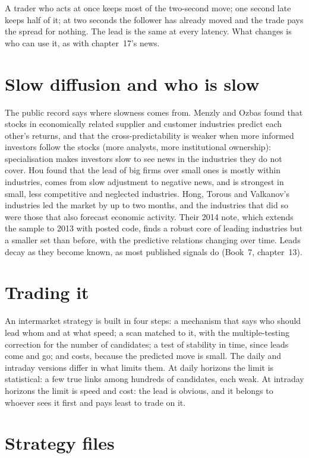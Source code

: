 A trader who acts at once keeps most of the two-second move; one second late keeps half of it; at two seconds the follower has already moved and the
trade pays the spread for nothing. The lead is the same at every latency. What changes is who can use it, as with chapter~17's news.

\section{Slow diffusion and who is slow}

The public record says where slowness comes from. Menzly and Ozbas found that stocks in economically related supplier and customer industries predict
each other's returns, and that the cross-predictability is weaker when more informed investors follow the stocks (more analysts, more institutional
ownership): specialisation makes investors slow to see news in the industries they do not cover. Hou found that the lead of big firms over small ones is
mostly within industries, comes from slow adjustment to negative news, and is strongest in small, less competitive and neglected industries. Hong,
Torous and Valkanov's industries led the market by up to two months, and the industries that did so were those that also forecast economic
activity. Their 2014 note, which extends the sample to 2013 with posted code, finds a robust core of leading industries but a smaller set than before,
with the predictive relations changing over time. Leads decay as they become known, as most published signals do (Book~7, chapter~13).

\section{Trading it}

An intermarket strategy is built in four steps: a mechanism that says who should lead whom and at what speed; a scan matched to it, with the
multiple-testing correction for the number of candidates; a test of stability in time, since leads come and go; and costs, because the predicted
move is small. The daily and intraday versions differ in what limits them. At daily horizons the limit is statistical: a few true links among
hundreds of candidates, each weak. At intraday horizons the limit is speed and cost: the lead is obvious, and it belongs to whoever sees it first
and pays least to trade on it.

\section{Strategy files}

